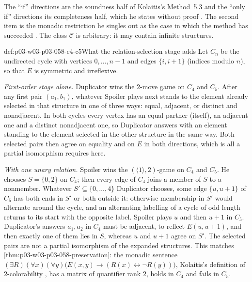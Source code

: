 The ``if'' directions are the soundness half of Kolaitis's Method~5.3 and
the ``only if'' directions its completeness half, which he states without
proof \cite[Method~5.3, pp.~26--27]{Kolaitis2003ExpressivePowerNotes}. The
second item is the monadic restriction he singles out as the case in which
the method has succeeded \cite[p.~27]{Kolaitis2003ExpressivePowerNotes}.
The class \(\mathcal C\) is arbitrary: it may contain infinite structures.

\begin{hbexample}{def:p03-w03-p03-058-c4-c5}{What the relation-selection stage adds}
Let \(C_n\) be the undirected cycle with vertices \(0,\ldots,n-1\) and
edges \(\{i,i+1\}\) (indices modulo \(n\)), so that \(E\) is symmetric and
irreflexive.

\emph{First-order stage alone.} Duplicator wins the \(2\)-move game on
\(C_4\) and \(C_5\). After any first pair \((a_1,b_1)\), whatever Spoiler
plays next stands to the element already selected in that structure in one
of three ways: equal, adjacent, or distinct and nonadjacent. In both cycles
every vertex has an equal partner (itself), an adjacent one and a distinct
nonadjacent one, so Duplicator answers with an element standing to the
element selected in the other structure in the same way. Both selected
pairs then agree on equality and on \(E\) in both directions, which is all
a partial isomorphism requires here.

\emph{With one unary relation.} Spoiler wins the
\((\langle1\rangle,2)\)-game on \(C_4\) and \(C_5\). He chooses
\(S=\{0,2\}\) on \(C_4\); then every edge of \(C_4\) joins a member of
\(S\) to a nonmember. Whatever \(S'\subseteq\{0,\ldots,4\}\) Duplicator
chooses, some edge \(\{u,u+1\}\) of \(C_5\) has both ends in \(S'\) or both
outside it: otherwise membership in \(S'\) would alternate around the cycle,
and an alternating labelling of a cycle of odd length returns to its start
with the opposite label. Spoiler plays \(u\) and then \(u+1\) in \(C_5\).
Duplicator's answers \(a_1,a_2\) in \(C_4\) must be adjacent, to reflect
\(E(u,u+1)\), and then exactly one of them lies in \(S\), whereas \(u\)
and \(u+1\) agree on \(S'\). The selected pairs are not a partial
isomorphism of the expanded structures. This matches
\cref{thm:p03-w03-p03-058-preservation}: the monadic sentence
\((\exists R)(\forall x)(\forall y)\bigl(E(x,y)\to(R(x)\leftrightarrow\neg
R(y))\bigr)\), Kolaitis's definition of 2-colorability
\cite[Example~2.5, p.~7]{Kolaitis2003ExpressivePowerNotes}, has a matrix of
quantifier rank \(2\), holds in \(C_4\) and fails in \(C_5\).
\end{hbexample}

